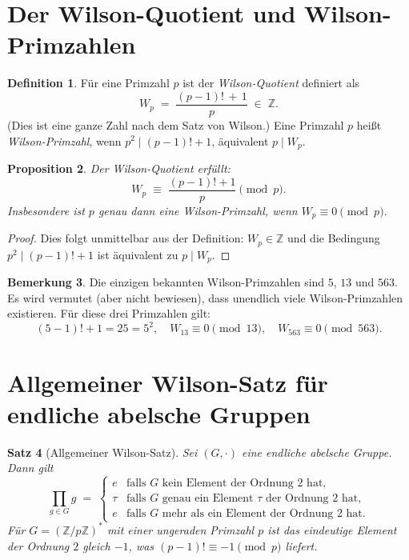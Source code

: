 \documentclass[12pt,a4paper]{amsart}
\newtheorem{theorem}{Satz}[section]
\newtheorem{proposition}[theorem]{Proposition}
\theoremstyle{definition}
\newtheorem{definition}[theorem]{Definition}
\newtheorem{bemerkung}[theorem]{Bemerkung}
\newcommand{\Z}{\mathbb{Z}}
\begin{document}
\section{Der Wilson-Quotient und Wilson-Primzahlen}

\begin{definition}\label{def:wilson_quotient}
  Für eine Primzahl $p$ ist der \emph{Wilson-Quotient} definiert als
  \[
    W_p \;=\; \frac{(p-1)!\,+\,1}{p} \;\in\; \Z.
  \]
  (Dies ist eine ganze Zahl nach dem Satz von Wilson.)
  Eine Primzahl $p$ heißt \emph{Wilson-Primzahl}, wenn $p^2 \mid (p-1)! + 1$,
  äquivalent $p \mid W_p$.
\end{definition}

\begin{proposition}\label{prop:wilson_quotient}
  Der Wilson-Quotient erfüllt:
  \[
    W_p \;\equiv\; \frac{(p-1)!+1}{p} \pmod{p}.
  \]
  Insbesondere ist $p$ genau dann eine Wilson-Primzahl, wenn $W_p \equiv 0 \pmod{p}$.
\end{proposition}

\begin{proof}
  Dies folgt unmittelbar aus der Definition: $W_p \in \Z$ und die Bedingung
  $p^2 \mid (p-1)!+1$ ist äquivalent zu $p \mid W_p$.
\end{proof}

\begin{bemerkung}
  Die einzigen bekannten Wilson-Primzahlen sind $5$, $13$ und $563$.
  Es wird vermutet (aber nicht bewiesen), dass unendlich viele Wilson-Primzahlen
  existieren.  Für diese drei Primzahlen gilt:
  \[
    (5-1)! + 1 = 25 = 5^2, \quad
    W_{13} \equiv 0 \pmod{13}, \quad
    W_{563} \equiv 0 \pmod{563}.
  \]
\end{bemerkung}

\section{Allgemeiner Wilson-Satz für endliche abelsche Gruppen}\label{satz:allgemein_wilson}

\begin{theorem}[Allgemeiner Wilson-Satz]\label{satz:allgemein_wilson}
  Sei $(G, \cdot)$ eine endliche abelsche Gruppe.  Dann gilt
  \[
    \prod_{g \in G} g
    \;=\;
    \begin{cases}
      e        & \text{falls } G \text{ kein Element der Ordnung } 2 \text{ hat}, \\
      \tau      & \text{falls } G \text{ genau ein Element } \tau \text{ der Ordnung } 2 \text{ hat}, \\
      e        & \text{falls } G \text{ mehr als ein Element der Ordnung } 2 \text{ hat}.
    \end{cases}
  \]
  Für $G = (\Z/p\Z)^*$ mit einer ungeraden Primzahl $p$ ist das eindeutige
  Element der Ordnung $2$ gleich $-1$, was $(p-1)! \equiv -1 \pmod{p}$ liefert.
\end{theorem}
\end{document}
